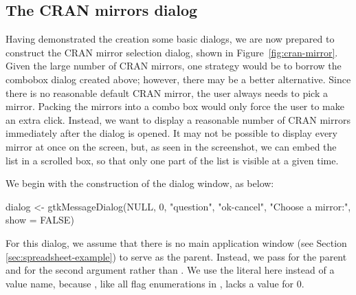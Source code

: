 \documentclass[article,shortnames]{jss}
\begin{document}
\subsection{The CRAN mirrors dialog}

Having demonstrated the creation some basic dialogs, we are now
prepared to construct the CRAN mirror selection dialog, shown in
Figure~\ref{fig:cran-mirror}.  Given the large number of CRAN mirrors,
one strategy would be to borrow the combobox dialog created above;
however, there may be a better alternative. Since there is no
reasonable default CRAN mirror, the user always needs to pick a
mirror. Packing the mirrors into a combo box would only force the user
to make an extra click.  Instead, we want to display a reasonable
number of CRAN mirrors immediately after the dialog is opened. It may
not be possible to display every mirror at once on the screen, but, as
seen in the screenshot, we can embed the list in a scrolled box, so
that only one part of the list is visible at a given time.

We begin with the construction of the dialog window, as below:
\begin{Code}
dialog <- gtkMessageDialog(NULL, 0, "question", "ok-cancel", 
                            "Choose a mirror:", show = FALSE)
\end{Code}
For this dialog,
we assume that there is no main application window (see Section
\ref{sec:spreadsheet-example}) to serve as the
parent. 
Instead, we pass  for the parent and  
for the second argument rather than . We
use the literal  here instead of a value name, because
, like all flag enumerations in , lacks
a value for $0$.
\end{document}
